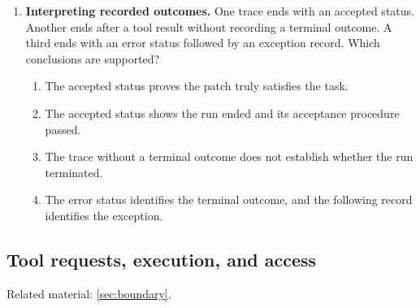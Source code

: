 \begin{enumerate}[start=21,itemsep=0.7\baselineskip]
\item\label{exercise:30} \begin{minipage}[t]{\linewidth}
\textbf{Interpreting recorded outcomes.} One trace ends with an accepted status. Another ends after a tool result without recording a terminal outcome. A third ends with an error status followed by an exception record. Which conclusions are supported?
\begin{enumerate}[label=\textnormal{(\Alph*)},leftmargin=*,itemsep=0pt]
\item The accepted status proves the patch truly satisfies the task.
\item The accepted status shows the run ended and its acceptance procedure passed.
\item The trace without a terminal outcome does not establish whether the run terminated.
\item The error status identifies the terminal outcome, and the following record identifies the exception.
\end{enumerate}
\end{minipage}

\end{enumerate}

\subsection{Tool requests, execution, and access}
\noindent Related material: \cref{sec:boundary}.

